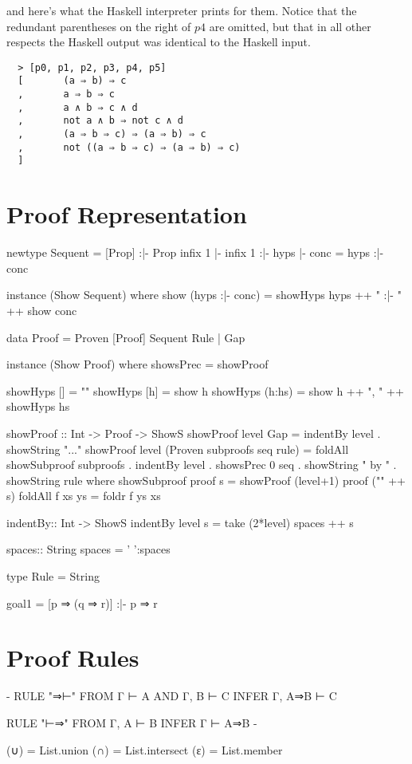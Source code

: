 \documentclass[11pt]{article}
\begin{document}
and here's what the Haskell interpreter prints for them. Notice that the redundant
parentheses on the right of $p4$ are omitted, but that in all other respects 
the Haskell output was identical to the Haskell input.
\begin{verbatim}
  > [p0, p1, p2, p3, p4, p5]
  [       (a ⇒ b) ⇒ c
  ,       a ⇒ b ⇒ c
  ,       a ∧ b ⇒ c ∧ d
  ,       not a ∧ b ⇒ not c ∧ d
  ,       (a ⇒ b ⇒ c) ⇒ (a ⇒ b) ⇒ c
  ,       not ((a ⇒ b ⇒ c) ⇒ (a ⇒ b) ⇒ c)
  ]
\end{verbatim}


\section{Proof Representation}
\begin{code}
  newtype Sequent = [Prop] :|- Prop
  infix 1 |-
  infix 1 :|-
  hyps |- conc = hyps :|- conc
      
  instance (Show Sequent) where 
     show (hyps :|- conc) = showHyps hyps ++ " :|- " ++ show conc
     
  data    Proof   = Proven [Proof] Sequent Rule
                  | Gap
                  
  instance (Show Proof) where
     showsPrec = showProof 
     
  showHyps []     = ""
  showHyps [h]    = show h
  showHyps (h:hs) = show h ++  ", " ++ showHyps hs
  
  showProof :: Int -> Proof -> ShowS
  showProof level Gap = indentBy level . showString "..."
  showProof level (Proven subproofs seq rule) =
            foldAll showSubproof subproofs .
            indentBy level                 .
            showsPrec 0 seq                .
            showString " by "              .
            showString rule
            where 
            showSubproof proof s = showProof (level+1) proof ("\n" ++ s)
            foldAll f xs ys = foldr f ys xs         
                  
  indentBy:: Int -> ShowS
  indentBy level s = take (2*level) spaces ++ s
  
  spaces:: String
  spaces = ' ':spaces 
  
  type Rule = String

  goal1 = [p ⇒ (q ⇒ r)] :|- p ⇒ r

  
\end{code}

\section{Proof Rules}
\begin{code}
{-
        RULE  "⇒⊢"
        FROM  Γ       ⊢ A
        AND   Γ, B    ⊢ C
        INFER Γ, A⇒B ⊢ C 
        
        RULE  "⊢⇒"
        FROM  Γ, A ⊢ B
        INFER Γ    ⊢ A⇒B
-}
\end{code}
\begin{code}
  (∪) = List.union
  (∩) = List.intersect
  (ε)  = List.member
  
  
\end{code}
\end{document}
